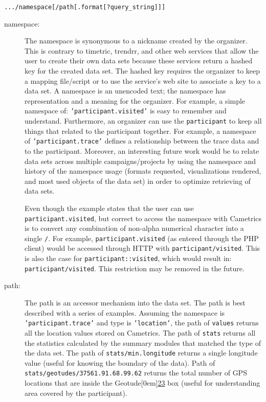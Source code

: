 \documentclass[10pt,a4paper,english]{article}
\begin{document}
\texttt{.../namespace{[}/path{[}.format{[}?query{\_}string{]}{]}{]}}
\begin{description}
\item[{namespace:}] \leavevmode 
The namespace is synonymous to a nickname created by the organizer. This is contrary to timetric, trendrr, and other web services that allow the user to create their own data sets because these services return a hashed key for the created data set. The hashed key requires the organizer to keep a mapping file/script or to use the service's web site to associate a key to a data set. A namespace is an unencoded text; the namespace has representation and a meaning for the organizer. For example, a simple namespace of: \texttt{'participant.visited'} is easy to remember and understand. Furthermore, an organizer can use the \texttt{participant} to keep all things that related to the participant together. For example, a namespace of \texttt{'participant.trace'} defines a relationship between the trace data and to the participant. Moreover, an interesting future work would be to relate data sets across multiple campaigns/projects by using the namespace and history of the namespace usage (formats requested, visualizations rendered, and most used objects of the data set) in order to optimize retrieving of data sets.

Even though the example states that the user can use \texttt{participant.visited}, but correct to access the namespace with Cametrics is to convert any combination of non-alpha numerical character into a single \texttt{/}. For example, \texttt{participant.visited} (as entered through the PHP client) would be accessed through HTTP with \texttt{participant/visited}. This is also the case for \texttt{participant::visited}, which would result in: \texttt{participant/visited}. This restriction may be removed in the future.

\item[{path:}] \leavevmode 
The path is an accessor mechanism into the data set. The path is best described with a series of examples. Assuming the namespace is \texttt{'participant.trace'} and type is \texttt{'location'}, the path of \texttt{values} returns all the location values stored on Cametrics. The path of \texttt{stats} returns all the statistics calculated by the summary modules that matched the type of the data set. The path of \texttt{stats/min.longitude} returns a single longitude value (useful for knowing the boundary of the data). Path of \texttt{stats/geotudes/37561.91.68.99.62} returns the total number of GPS locations that are inside the Geotude\raisebox{.5em}[0em]{\scriptsize\hyperlink{id51}{23}} box (useful for understanding area covered by the participant).


\end{description}
\end{document}

